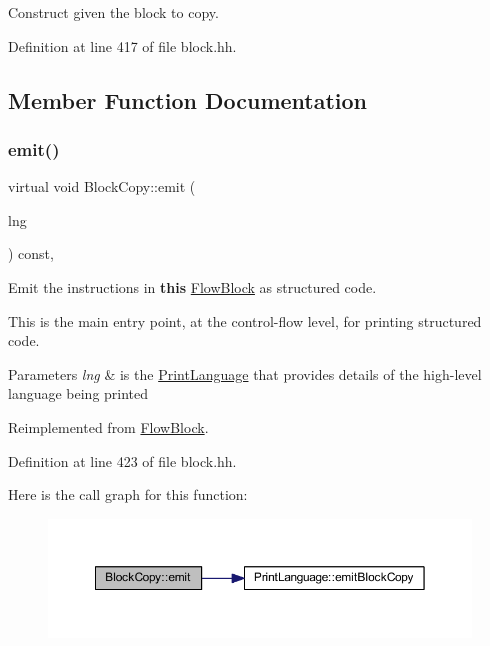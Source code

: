 Construct given the block to copy. 



Definition at line 417 of file block.\+hh.



\subsection{Member Function Documentation}
\mbox{\label{class_block_copy_a4336d4193f96a1499ee1d97281548a33}} 
\subsubsection{\texorpdfstring{emit()}{emit()}}
{\footnotesize\ttfamily virtual void Block\+Copy\+::emit (\begin{DoxyParamCaption}\item[{\mbox{\hyperlink{class_print_language}{Print\+Language}} $\ast$}]{lng }\end{DoxyParamCaption}) const\hspace{0.3cm}{\ttfamily [inline]}, {\ttfamily [virtual]}}



Emit the instructions in {\bfseries{this}} \mbox{\hyperlink{class_flow_block}{Flow\+Block}} as structured code. 

This is the main entry point, at the control-\/flow level, for printing structured code. 
\begin{DoxyParams}{Parameters}
{\em lng} & is the \mbox{\hyperlink{class_print_language}{Print\+Language}} that provides details of the high-\/level language being printed \\
\hline
\end{DoxyParams}


Reimplemented from \mbox{\hyperlink{class_flow_block_a9baddec2635c95a5ac9019d6b21d3eab}{Flow\+Block}}.



Definition at line 423 of file block.\+hh.

Here is the call graph for this function\+:
\nopagebreak
\begin{figure}[H]
\begin{center}
\leavevmode
\includegraphics[width=350pt]{class_block_copy_a4336d4193f96a1499ee1d97281548a33_cgraph}
\end{center}
\end{figure}
\mbox{\label{class_block_copy_ae7643bde7387390aaf61e2b4747bc5a7}} 
